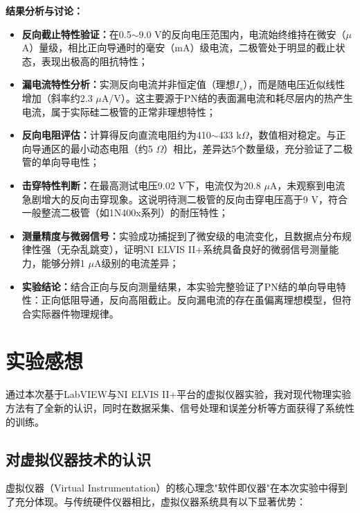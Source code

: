 \documentclass[11pt]{article}
\begin{document}
\noindent\textbf{结果分析与讨论：}
\begin{itemize}[leftmargin=2em,itemsep=2pt,parsep=0.5ex]
    \item \textbf{反向截止特性验证：}在0.5$\sim$9.0 V的反向电压范围内，电流始终维持在微安（$\mu$A）量级，相比正向导通时的毫安（mA）级电流，二极管处于明显的截止状态，表现出极高的阻抗特性；
    
    \item \textbf{漏电流特性分析：}实测反向电流并非恒定值（理想$I_s$），而是随电压近似线性增加（斜率约2.3 $\mu$A/V）。这主要源于PN结的表面漏电流和耗尽层内的热产生电流，属于实际硅二极管的正常非理想特性；
    
    \item \textbf{反向电阻评估：}计算得反向直流电阻约为410$\sim$433 k$\Omega$，数值相对稳定。与正向导通区的最小动态电阻（约5 $\Omega$）相比，差异达5个数量级，充分验证了二极管的单向导电性；
    
    \item \textbf{击穿特性判断：}在最高测试电压9.02 V下，电流仅为20.8 $\mu$A，未观察到电流急剧增大的反向击穿现象。这说明待测二极管的反向击穿电压高于9 V，符合一般整流二极管（如1N400x系列）的耐压特性；
    
    \item \textbf{测量精度与微弱信号：}实验成功捕捉到了微安级的电流变化，且数据点分布规律性强（无杂乱跳变），证明NI ELVIS II+系统具备良好的微弱信号测量能力，能够分辨1 $\mu$A级别的电流差异；
    
    \item \textbf{实验结论：}结合正向与反向测量结果，本实验完整验证了PN结的单向导电特性：正向低阻导通，反向高阻截止。反向漏电流的存在虽偏离理想模型，但符合实际器件物理规律。
\end{itemize}

\section{实验感想}

通过本次基于LabVIEW与NI ELVIS II+平台的虚拟仪器实验，我对现代物理实验方法有了全新的认识，同时在数据采集、信号处理和误差分析等方面获得了系统性的训练。

\subsection{对虚拟仪器技术的认识}

虚拟仪器（Virtual Instrumentation）的核心理念"软件即仪器"在本次实验中得到了充分体现。与传统硬件仪器相比，虚拟仪器系统具有以下显著优势：
\end{document}
